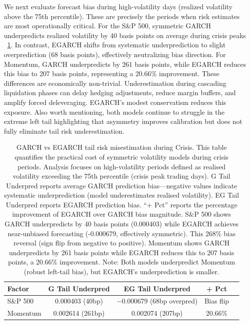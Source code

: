 \documentclass{article}
\begin{document}
We next evaluate forecast bias during high-volatility days (realized volatility above the 75th percentile). These are precisely the periods when risk estimates are most operationally critical. For the S\&P 500, symmetric GARCH underpredicts realized volatility by 40 basis points on average during crisis peaks ~\ref{tab:tail_risk_underprediction}. In contrast, EGARCH shifts from systematic underprediction to slight overprediction (68 basis points), effectively neutralizing bias direction. For Momentum, GARCH underpredicts by 261 basis points, while EGARCH reduces this bias to 207 basis points, representing a 20.66\% improvement. These differences are economically non-trivial. Underestimation during cascading liquidation phases can delay hedging adjustments, reduce margin buffers, and amplify forced deleveraging. EGARCH’s modest conservatism reduces this exposure. Also worth mentioning, both models continue to struggle in the extreme left tail highlighting that asymmetry improves calibration but does not fully eliminate tail risk underestimation.\newline

\begin{table}[htbp]
\centering
\caption{GARCH vs EGARCH tail risk misestimation during Crisis. This table quantifies the practical cost of symmetric volatility models during crisis periods. Analysis focuses on high-volatility periods defined as realised volatility exceeding the 75th percentile (crisis peak trading days). G Tail Underpred reports average GARCH prediction bias—negative values indicate systematic underprediction (model underestimates realised volatility). EG Tail Underpred reports EGARCH prediction bias. “+ Pct” reports the percentage improvement of EGARCH over GARCH bias magnitude. S\&P 500 shows GARCH underpredicts by 40 basis points (0.000403) while EGARCH achieves near-unbiased forecasting (-0.000679, effectively symmetric). This 268\% bias reversal (sign flip from negative to positive). Momentum shows GARCH underpredicts by 261 basis points while EGARCH reduces this to 207 basis points, a 20.66\% improvement. Note: Both models underpredict Momentum (robust left-tail bias), but EGARCH’s underprediction is smaller.}
\label{tab:tail_risk_underprediction}
\begin{tabular}{lcccc}
\toprule
\textbf{Factor} & \textbf{G Tail Underpred} & \textbf{EG Tail Underpred} & \textbf{+ Pct} \\
\midrule
S\&P 500   & 0.000403 (40bp)    & $-$0.000679 (68bp overpred) & Bias flip \\
Momentum   & 0.002614 (261bp)   & 0.002074 (207bp)            & 20.66\% \\
\bottomrule
\end{tabular}
\end{table}
\end{document}
